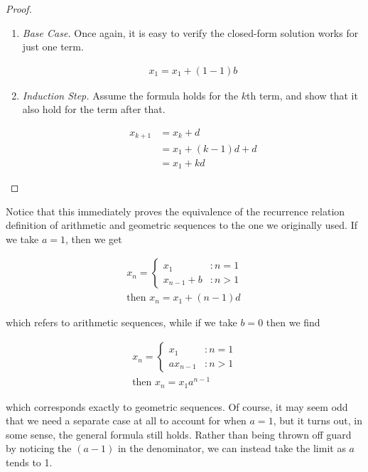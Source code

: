 \begin{proof}
	\begin{enumerate}
		\item \emph{Base Case.} Once again, it is easy to verify the closed-form solution works for just one term.
		
		\begin{align*}
			x_1 = x_1 + (1 - 1)b
		\end{align*}
		
		\item \emph{Induction Step.} Assume the formula holds for the $k$th term, and show that it also hold for the term after that.
		
		\begin{align*}
			x_{k + 1} &= x_{k} + d \\
			&= x_1 + (k - 1)d + d \\
			&= x_1 + kd
		\end{align*}
	\end{enumerate}
\end{proof}
\vspace{\baselineskip}

Notice that this immediately proves the equivalence of the recurrence relation definition of arithmetic and geometric sequences to the one we originally used. If we take $a = 1$, then we get

\begin{align*}
	x_n =
	\begin{cases}
		x_1 &: n = 1 \\
		x_{n - 1} + b &: n > 1
	\end{cases} \\
	\text{then } x_n = x_1 + (n - 1) d
\end{align*}

which refers to arithmetic sequences, while if we take $b = 0$ then we find

\begin{align*}
	x_n =
	\begin{cases}
		x_1 &: n = 1 \\
		ax_{n - 1} &: n > 1
	\end{cases} \\
	\text{then } x_n = x_1 a^{n - 1}
\end{align*}

which corresponds exactly to geometric sequences. Of course, it may seem odd that we need a separate case at all to account for when $a = 1$, but it turns out, in some sense, the general formula still holds. Rather than being thrown off guard by noticing the $(a - 1)$ in the denominator, we can instead take the limit as $a$ tends to 1.

